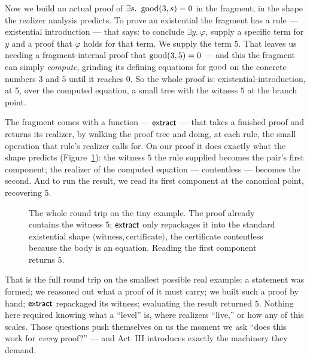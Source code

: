 \documentclass[11pt]{article}
\begin{document}
Now we build an actual proof of $\exists s.\ \operatorname{good}(3,s)=0$ in the fragment,
in the shape the realizer analysis predicts. To prove an existential the
fragment has a rule --- existential introduction --- that says: to conclude
$\exists y.\ \varphi$, supply a specific term for $y$ and a proof that
$\varphi$ holds for that term. We supply the term $5$. That leaves us needing
a fragment-internal proof that $\operatorname{good}(3,5)=0$ --- and this the fragment can
simply \emph{compute}, grinding its defining equations for $\operatorname{good}$ on the
concrete numbers $3$ and $5$ until it reaches $0$. So the whole proof is:
existential-introduction, at $5$, over the computed equation, a small tree
with the witness $5$ at the branch point.

The fragment comes with a function --- $\mathsf{extract}$ --- that takes a finished
proof and returns its realizer, by walking the proof tree and doing, at each
rule, the small operation that rule's realizer calls for. On our proof it
does exactly what the shape predicts (Figure~\ref{fig:extract2}): the witness
$5$ the rule supplied becomes the pair's first component; the realizer of the
computed equation --- contentless --- becomes the second. And to run the
result, we read its first component at the canonical point, recovering $5$.

\begin{figure}[h]
\centering
{}
\caption{The whole round trip on the tiny example. The proof already
contains the witness $5$; $\mathsf{extract}$ only repackages it into the standard
existential shape $\langle\text{witness},\text{certificate}\rangle$, the
certificate contentless because the body is an equation. Reading the first
component returns $5$.}
\label{fig:extract2}
\end{figure}

That is the full round trip on the smallest possible real example: a
statement was formed; we reasoned out what a proof of it must carry; we built
such a proof by hand; $\mathsf{extract}$ repackaged its witness; evaluating the
result returned $5$. Nothing here required knowing what a ``level'' is, where
realizers ``live,'' or how any of this scales. Those questions push
themselves on us the moment we ask ``does this work for \emph{every} proof?''
--- and Act~III introduces exactly the machinery they demand.
\end{document}

